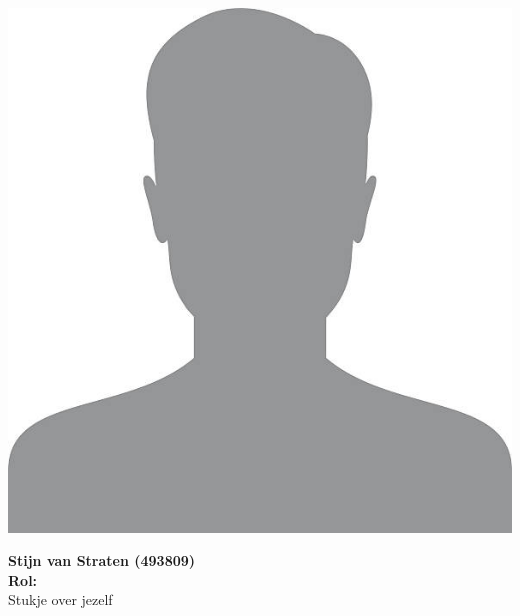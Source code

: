 \documentclass{BK5}
\begin{document}
	\begin{minipage}{0.5\linewidth}
		\includegraphics[width=\linewidth]{unknown.jpg}
	\end{minipage}
	\hfill
	\vspace{1cm}
	\begin{minipage}{\linewidth}
		\textbf{Stijn van Straten (493809)} \\
		\textbf{Rol:}  \\
		Stukje over jezelf
	\end{minipage}
	
	\vspace{1cm}
	
\end{document}
